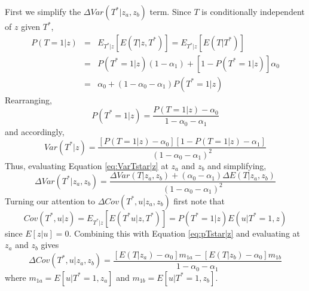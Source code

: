 First we simplify the $\Delta Var(T^*|z_a,z_b)$ term.
Since $T$ is conditionally independent of $z$ given $T^*$, 
\begin{eqnarray*}
  P(T=1|z) &=& E_{T^*|z}\left[E\left( T|z,T^* \right)  \right] = E_{T^*|z}\left[E\left( T|T^* \right)  \right]\\
  &=&  P\left( T^* = 1 | z \right) \left( 1-\alpha_1 \right) + \left[ 1 - P\left( T^*=1|z \right) \right] \alpha_0\\
  &=& \alpha_0 + \left( 1 - \alpha_0 - \alpha_1 \right) P(T^*=1|z)
\end{eqnarray*}
Rearranging,
\begin{equation}
  P(T^*=1|z) = \frac{P(T=1|z) - \alpha_0}{1 - \alpha_0 - \alpha_1}
  \label{eq:pTstar|z}
\end{equation}
and accordingly,
\begin{equation}
  Var(T^*|z) = \frac{\left[ P\left( T=1|z \right) - \alpha_0 \right]\left[ 1 - P\left( T=1|z \right) - \alpha_1 \right]}{\left( 1 - \alpha_0 - \alpha_1 \right)^2}
  \label{eq:VarTstar|z}
\end{equation}
Thus, evaluating Equation \ref{eq:VarTstar|z} at $z_a$ and $z_b$ and simplifying,
\begin{equation}
  \Delta Var(T^*|z_a,z_b) = \frac{\Delta Var(T|z_a,z_b) + \left( \alpha_0 - \alpha_1 \right) \Delta E(T|z_a, z_b) }{\left( 1 - \alpha_0 - \alpha_1 \right)^2}
  \label{eq:vardiffTstar}
\end{equation}
Turning our attention to $\Delta Cov(T^*,u|z_a,z_b)$ first note that
\begin{equation}
  Cov(T^*,u|z) = E_{T^*|z}\left[E\left( T^*u|z,T^* \right)  \right] = P(T^*=1|z)E\left( u|T^*=1,z \right) 
  \label{eq:covTstaru}
\end{equation}
since $E[z|u] = 0$.
Combining this with Equation \ref{eq:pTstar|z} and evaluating at $z_a$ and $z_b$ gives
\begin{equation}
  \Delta Cov(T^*,u|z_a,z_b) = \frac{\left[E\left( T|z_a \right) - \alpha_0\right] m_{1a} - \left[ E(T|z_b) - \alpha_0 \right] m_{1b} }{1 - \alpha_0 - \alpha_1}
  \label{eq:diffCovTstaru}
\end{equation}
where $m_{1a} = E\left[ u|T^*=1,z_a \right]$ and $m_{1b} = E[u|T^*=1,z_b]$.

